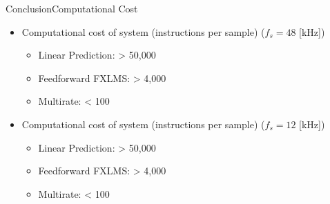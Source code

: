 \begin{frame}{Conclusion}{Computational Cost}		
\begin{itemize}
\item Computational cost of system (instructions per sample) ($f_s = 48$ [kHz])
	\begin{itemize}
		\item Linear Prediction: > 50,000 
		\item Feedforward FXLMS: > 4,000 
		\item Multirate: < 100
	\end{itemize}
\item Computational cost of system (instructions per sample) ($f_s = 12$ [kHz])
	\begin{itemize}
		\item Linear Prediction: > 50,000 
		\item Feedforward FXLMS: > 4,000 
		\item Multirate: < 100
	\end{itemize}
\end{itemize}
\end{frame}